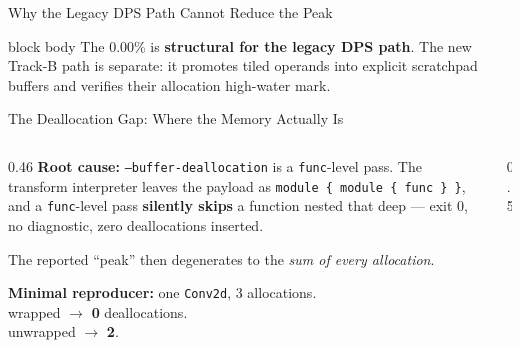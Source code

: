 \documentclass[10pt,aspectratio=169]{beamer}
\begin{document}
\begin{frame}{Why the Legacy DPS Path Cannot Reduce the Peak}
\vspace{0.1cm}
\begin{beamercolorbox}[sep=0.25em,center,rounded=true,shadow=true]{block body}
\footnotesize
The 0.00\% is \textbf{structural for the legacy DPS path}. The new Track-B
path is separate: it promotes tiled operands into explicit scratchpad buffers
and verifies their allocation high-water mark.
\end{beamercolorbox}
\end{frame}

\begin{frame}{The Deallocation Gap: Where the Memory Actually Is}
\begin{columns}[T,totalwidth=0.99\textwidth]
\begin{column}{0.46\textwidth}
\textbf{Root cause:} \texttt{--buffer-deallocation} is a \texttt{func}-level pass.
The transform interpreter leaves the payload as
\texttt{module \{ module \{ func \} \}}, and a \texttt{func}-level pass
\textbf{silently skips} a function nested that deep --- exit 0, no diagnostic,
zero deallocations inserted.

\vspace{0.2cm}
The reported ``peak'' then degenerates to the \emph{sum of every allocation}.

\vspace{0.2cm}
\textbf{Minimal reproducer:} one \texttt{Conv2d}, 3 allocations.\\
wrapped $\rightarrow$ \textbf{0} deallocations.\\
unwrapped $\rightarrow$ \textbf{2}.
\end{column}

\begin{column}{0.5\textwidth}
\centering
{}


\end{column}
\end{columns}
\end{frame}
\end{document}
